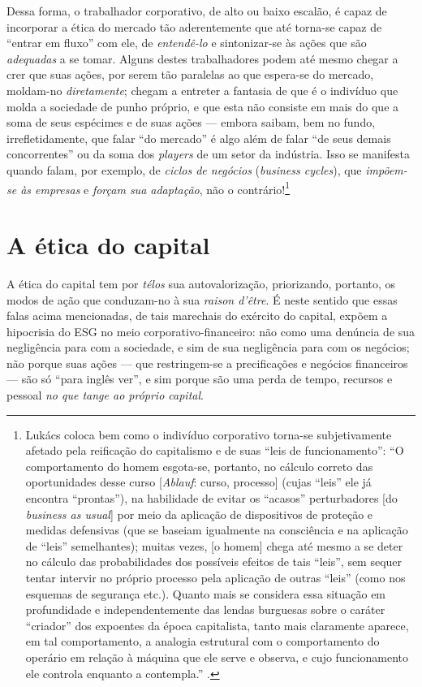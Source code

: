 \documentclass[12pt]{article}
\begin{document}
Dessa forma, o trabalhador corporativo, de alto ou baixo escalão, é capaz de incorporar a ética do mercado tão aderentemente que até torna-se capaz de ``entrar em fluxo'' com ele, de \textit{entendê-lo} e sintonizar-se às ações que são \textit{adequadas} a se tomar. Alguns destes trabalhadores podem até mesmo chegar a crer que suas ações, por serem tão paralelas ao que espera-se do mercado, moldam-no \textit{diretamente}; chegam a entreter a fantasia de que é o indivíduo que molda a sociedade de punho próprio, e que esta não consiste em mais do que a soma de seus espécimes e de suas ações --- embora saibam, bem no fundo, irrefletidamente, que falar ``do mercado'' é algo além de falar ``de seus demais concorrentes'' ou da soma dos \textit{players} de um setor da indústria. Isso se manifesta quando falam, por exemplo, de \textit{ciclos de negócios} (\textit{business cycles}), que \textit{impõem-se às empresas} e \textit{forçam sua adaptação}, não o contrário!\footnote{Lukács coloca bem como o indivíduo corporativo torna-se subjetivamente afetado pela reificação do capitalismo e de suas ``leis de funcionamento'': ``O comportamento do homem esgota-se, portanto, no cálculo correto das oportunidades desse curso [\textit{Ablauf}: curso, processo] (cujas ``leis'' ele já encontra ``prontas''), na habilidade de evitar os ``acasos'' perturbadores [do \textit{business as usual}] por meio da aplicação de dispositivos de proteção e medidas defensivas (que se baseiam igualmente na consciência e na aplicação de ``leis'' semelhantes); muitas vezes, [o homem] chega até mesmo a se deter no cálculo das probabilidades dos possíveis efeitos de tais ``leis'', sem sequer tentar intervir no próprio processo pela aplicação de outras ``leis'' (como nos esquemas de segurança etc.). Quanto mais se considera essa situação em profundidade e independentemente das lendas burguesas sobre o caráter ``criador'' dos expoentes da época capitalista, tanto mais claramente aparece, em tal comportamento, a analogia estrutural com o comportamento do operário em relação à máquina que ele serve e observa, e cujo funcionamento ele controla enquanto a contempla.'' \cite[p. 218-9; destaques meus]{Lukacs2003a}.}







\section{A ética do capital}
A ética do capital tem por \textit{télos} sua autovalorização, priorizando, portanto, os modos de ação que conduzam-no à sua \textit{raison d'être}. É neste sentido que essas falas acima mencionadas, de tais marechais do exército do capital, expõem a hipocrisia do ESG no meio corporativo-financeiro: não como uma denúncia de sua negligência para com a sociedade, e sim de sua negligência para com os negócios; não porque suas ações --- que restringem-se a precificações e negócios financeiros --- são só ``para inglês ver'', e sim porque são uma perda de tempo, recursos e pessoal \textit{no que tange ao próprio capital}. 
\end{document}
